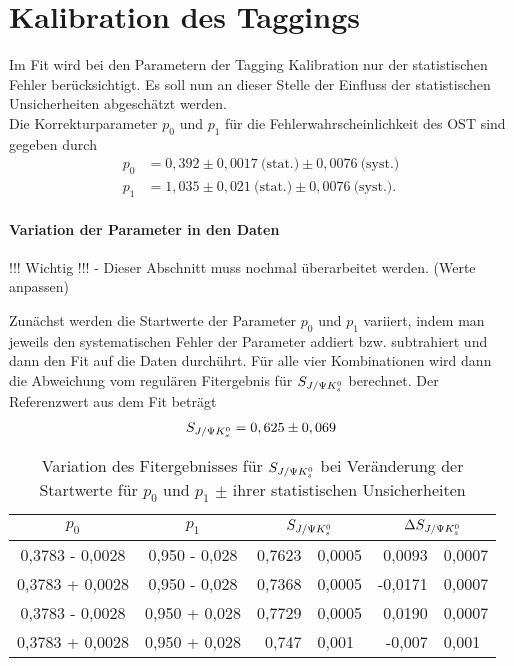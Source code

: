 \section{Kalibration des Taggings}
Im Fit wird bei den Parametern der Tagging Kalibration nur der statistischen Fehler berücksichtigt. Es soll nun an dieser Stelle der Einfluss der statistischen Unsicherheiten abgeschätzt werden. \\
Die Korrekturparameter $p_0$ und $p_1$ für die Fehlerwahrscheinlichkeit des \gls{OST} sind gegeben durch
\begin{align}
p_0 &= 0,392 \pm 0,0017\ \text{(stat.)} \pm 0,0076\ \text{(syst.)} \\
p_1 &= 1,035 \pm 0,021\ \text{(stat.)} \pm 0,0076\ \text{(syst.)}.
\end{align}

\paragraph{Variation der Parameter in den Daten}
!!! Wichtig !!! - Dieser Abschnitt muss nochmal überarbeitet werden. (Werte anpassen)

Zunächst werden die Startwerte der Parameter $p_0$ und $p_1$ variiert, indem man jeweils den systematischen Fehler der Parameter addiert bzw. subtrahiert und dann den Fit auf die Daten durchührt. Für alle vier Kombinationen wird dann die Abweichung vom regulären Fitergebnis für $S_{J/\Psi K_s^0}$ berechnet. Der Referenzwert aus dem Fit beträgt
\begin{align}
S_{J/\Psi K_s^0} = 0,625 \pm 0,069
\end{align}

\begin{table}[hptb]
\centering
\caption{Variation des Fitergebnisses für $S_{J/\Psi K_s^0}$ bei Veränderung der Startwerte für $p_0$ und $p_1$ $\pm$ ihrer statistischen Unsicherheiten}
\label{tab:syst_fit_calib_data}
\begin{tabular}{cc|r@{$\pm$}l|r@{$\pm$}l}
\hline\hline
$p_0$  &  $p_1$  &  \multicolumn{2}{c}{$S_{J/\Psi K_s^0}$}  & \multicolumn{2}{c}{$\Delta S_{J/\Psi K_s^0}$}   \\ \hline
0,3783 - 0,0028  &  0,950 - 0,028  &  0,7623 & 0,0005  &   0,0093 & 0,0007 \\
0,3783 + 0,0028  &  0,950 - 0,028  &  0,7368 & 0,0005  &  -0,0171 & 0,0007 \\
0,3783 - 0,0028  &  0,950 + 0,028  &  0,7729 & 0,0005  &   0,0190 & 0,0007 \\
0,3783 + 0,0028  &  0,950 + 0,028  &  0,747  & 0,001   &  -0,007  & 0,001 \\
\hline\hline
\end{tabular}
\end{table}

